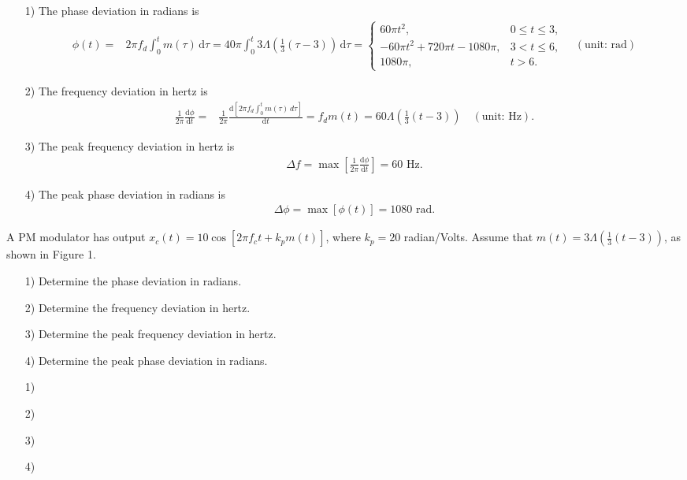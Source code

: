 \documentclass{assignment}
\begin{document}
\begin{sol}
    \begin{itemize}
        \item[1)] The phase deviation in radians is
        \begin{align}
            \phi(t)=&2\pi f_d\int_0^tm(\tau)\,\mathrm{d}\tau=40\pi\int_0^t3\Lambda\left(\frac{1}{3}(\tau-3)\right)\,\mathrm{d}\tau=\left\{\begin{array}{ll}
                60\pi t^2,&0\leq t\leq 3,\\
                -60\pi t^2+720\pi t-1080\pi,&3<t\leq 6,\\
                1080\pi,&t>6.
            \end{array}\right.\quad(\text{unit: rad})
        \end{align}
        \item[2)] The frequency deviation in hertz is
        \begin{align}
            \frac{1}{2\pi}\frac{\mathrm{d}\phi}{\mathrm{d}t}=&\frac{1}{2\pi}\frac{\mathrm{d}\left[2\pi f_d\int_0^tm(\tau)\,d\tau\right]}{\mathrm{d}t}=f_dm(t)=60\Lambda\left(\frac{1}{3}(t-3)\right)\quad(\text{unit: Hz}).
        \end{align}
        \item[3)] The peak frequency deviation in hertz is
        \begin{align}
            \Delta f=\max\left[\frac{1}{2\pi}\frac{\mathrm{d}\phi}{\mathrm{d}t}\right]=60\text{ Hz}.
        \end{align}
        \item[4)] The peak phase deviation in radians is
        \begin{align}
            \Delta\phi=\max[\phi(t)]=1080\text{ rad}.
        \end{align}
    \end{itemize}
\end{sol}

\begin{prob}
    A PM modulator has output $x_c(t)=10\cos[2\pi f_ct+k_pm(t)]$, where $k_p=20$ radian/Volts. Assume that $m(t)=3\Lambda\left(\frac{1}{3}(t-3)\right)$, as shown in Figure 1.
    \begin{itemize}
        \item[1)] Determine the phase deviation in radians.
        \item[2)] Determine the frequency deviation in hertz.
        \item[3)] Determine the peak frequency deviation in hertz.
        \item[4)] Determine the peak phase deviation in radians.
    \end{itemize}
\end{prob}
\begin{sol}
    \begin{itemize}
        \item[1)] 
        \item[2)] 
        \item[3)] 
        \item[4)] 
    \end{itemize}
\end{sol}
\end{document}

